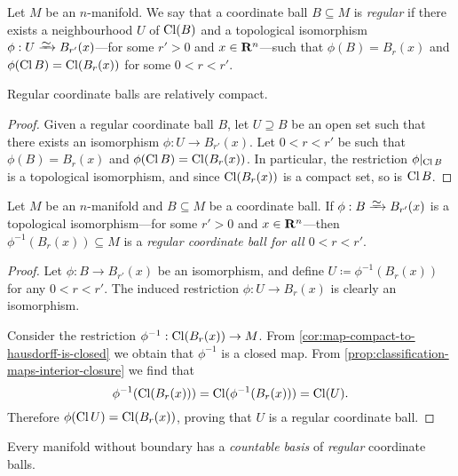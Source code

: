 \begin{definition}
\label{def:regular-coordinate-ball}
Let \(M\) be an \(n\)-manifold. We say that a coordinate ball \(B \subseteq M\)
is \emph{regular} if there exists a neighbourhood \(U\) of \(\operatorname{Cl}(B)\) and a
topological isomorphism \(\phi: U \isoto B_{r'}(x)\)---for some \(r' > 0\) and
\(x \in \mathbf{R}^n\)---such that \(\phi(B) = B_r(x)\) and
\(\phi(\operatorname{Cl} B) = \operatorname{Cl}(B_r(x))\) for some \(0 < r < r'\).
\end{definition}

\begin{corollary}
\label{cor:reg-coord-balls-are-rel-cpct}
Regular coordinate balls are relatively compact.
\end{corollary}

\begin{proof}
Given a regular coordinate ball \(B\), let \(U \supseteq B\) be an open set such
that there exists an isomorphism \(\phi: U \to B_{r'}(x)\). Let \(0 < r < r'\)
be such that \(\phi(B) = B_r(x)\) and \(\phi(\operatorname{Cl} B) = \operatorname{Cl}(B_r(x))\). In
particular, the restriction \(\phi|_{\operatorname{Cl} B}\) is a topological isomorphism, and
since \(\operatorname{Cl}(B_r(x))\) is a compact set, so is \(\operatorname{Cl} B\).
\end{proof}

\begin{lemma}
\label{lem:reg-coord-ball-from-iso}
Let \(M\) be an \(n\)-manifold and \(B \subseteq M\) be a coordinate ball. If
\(\phi: B \isoto B_{r'}(x)\) is a topological isomorphism---for some
\(r' > 0\) and \(x \in \mathbf{R}^n\)---then \(\phi^{-1}(B_r(x)) \subseteq M\) is a
\emph{regular coordinate ball for all \(0 < r < r'\)}.
\end{lemma}

\begin{proof}
Let \(\phi: B \to B_{r'}(x)\) be an isomorphism, and define
\(U \coloneq \phi^{-1}(B_r(x))\) for any \(0 < r < r'\). The induced restriction
\(\phi: U \to B_r(x)\) is clearly an isomorphism.

Consider the restriction \(\phi^{-1}: \operatorname{Cl}(B_r(x)) \to M\). From
\cref{cor:map-compact-to-hausdorff-is-closed} we obtain that \(\phi^{-1}\) is a
closed map. From \cref{prop:classification-maps-interior-closure} we find that
\[
\phi^{-1}(\operatorname{Cl}(B_r(x))) = \operatorname{Cl}(\phi^{-1}(B_r(x))) = \operatorname{Cl}(U).
\]
Therefore \(\phi(\operatorname{Cl} U) = \operatorname{Cl}(B_r(x))\), proving that \(U\) is a regular
coordinate ball.
\end{proof}

\begin{proposition}
\label{prop:man-countable-basis-reg-balls}
Every manifold without boundary has a \emph{countable basis} of \emph{regular}
coordinate balls.
\end{proposition}

